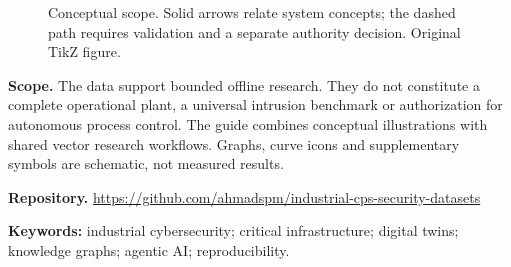 \documentclass[10pt,a4paper]{article}
\begin{document}
\begin{figure}[H]\centering
{}
\caption{Conceptual scope. Solid arrows relate system concepts; the dashed path requires validation and a separate authority decision. Original TikZ figure.}
\end{figure}
\textbf{Scope.} The data support bounded offline research. They do not constitute a complete operational plant, a universal intrusion benchmark or authorization for autonomous process control. The guide combines conceptual illustrations with shared vector research workflows. Graphs, curve icons and supplementary symbols are schematic, not measured results.

\textbf{Repository.} \url{https://github.com/ahmadspm/industrial-cps-security-datasets}

\textbf{Keywords:} industrial cybersecurity; critical infrastructure; digital twins; knowledge graphs; agentic AI; reproducibility.
\clearpage
\end{document}
